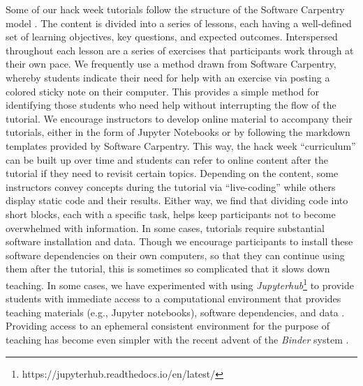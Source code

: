 \documentclass{aastex62}
\begin{document}
Some of our hack week tutorials follow the structure of the Software Carpentry model \citep{b:wilson-swc-lessons-2016}. The content is divided into a series of lessons, each having a well-defined set of learning objectives, key questions, and expected outcomes. Interspersed throughout each lesson are a series of exercises that participants work through at their own pace. We frequently use a method drawn from Software Carpentry, whereby students indicate their need for help with an exercise via posting a colored sticky note on their computer. This provides a simple method for identifying those students who need help without interrupting the flow of the tutorial. We encourage instructors to develop online material to accompany their tutorials, either in the form of Jupyter Notebooks \citep{kluyver2016jupyter} or by following the markdown templates provided by Software Carpentry. This way, the hack week ``curriculum'' can be built up over time and students can refer to online content after the tutorial if they need to revisit certain topics. Depending on the content, some instructors convey concepts during the tutorial via ``live-coding'' while others display static code and their results. Either way, we find that dividing code into short blocks, each with a specific task, helps keep participants not to become overwhelmed with information.
In some cases, tutorials require substantial software installation and data. Though we encourage participants to install these software dependencies on their own computers, so that they can continue using them after the tutorial, this is sometimes so complicated that it slows down teaching. In some cases, we have experimented with using \emph{Jupyterhub}\footnote{https://jupyterhub.readthedocs.io/en/latest/} to provide students with immediate access to a computational environment that provides teaching materials (e.g., Jupyter notebooks), software dependencies, and data \citep{holdgraf2017portable}. Providing access to an ephemeral consistent environment for the purpose of teaching has become even simpler with the recent advent of the \emph{Binder} system \citep{Holdgraf2017-pd, Titus_Brown_undated-pc}.
\end{document}

